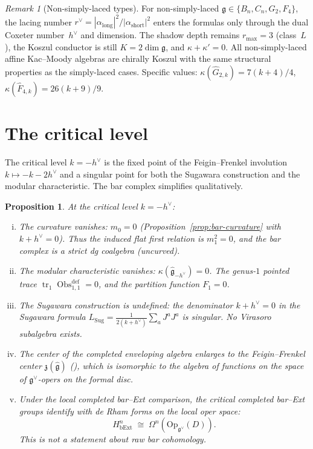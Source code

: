 \documentclass[11pt]{article}
\theoremstyle{plain}
\newtheorem{proposition}[theorem]{Proposition}
\theoremstyle{definition}
\theoremstyle{remark}
\newtheorem{remark}[theorem]{Remark}
\newcommand{\fg}{\mathfrak{g}}
\newcommand{\ghat}{\widehat{\fg}}
\numberwithin{equation}{section}
\begin{document}
\begin{remark}[Non-simply-laced types]\label{rem:nsl}
For non-simply-laced $\fg \in \{B_n, C_n, G_2, F_4\}$,
the lacing number
$r^\vee = |\alpha_{\mathrm{long}}|^2/|\alpha_{\mathrm{short}}|^2$
enters the formulas only through the dual Coxeter
number~$h^\vee$ and dimension. The shadow depth remains
$r_{\max} = 3$ (class~$L$), the Koszul conductor is
still $K = 2\dim\fg$, and $\kappa + \kappa' = 0$.
All non-simply-laced affine Kac--Moody algebras are
chirally Koszul with the same structural properties as
the simply-laced cases. Specific values:
$\kappa(\widehat{G}_{2,k}) = 7(k{+}4)/4$,
$\kappa(\widehat{F}_{4,k}) = 26(k{+}9)/9$.
\end{remark}


\section{The critical level}\label{sec:critical}

The critical level $k = -h^\vee$ is the fixed point of the
Feigin--Frenkel involution $k \mapsto -k - 2h^\vee$ and a
singular point for both the Sugawara construction and the
modular characteristic. The bar complex simplifies
qualitatively.

\begin{proposition}\label{prop:critical-bar}
At the critical level $k = -h^\vee$:
\begin{enumerate}[(i)]
\item The curvature vanishes: \(m_0=0\)
 \textup{(}Proposition~\textup{\ref{prop:bar-curvature}}
 with $k + h^\vee = 0$\textup{)}.
 Thus the induced flat first relation is \(m_1^2=0\), and the bar
 complex is a strict dg coalgebra \textup{(}uncurved\textup{)}.
\item The modular characteristic vanishes:
 $\kappa(\ghat_{-h^\vee}) = 0$. The genus-$1$
 pointed trace
 $\operatorname{tr}_1\operatorname{Obs}^{\mathrm{def}}_{1,1}=0$, and the
 partition function $F_1 = 0$.
\item The Sugawara construction is undefined: the
 denominator $k + h^\vee = 0$ in the Sugawara
 formula $L_{\mathrm{Sug}}
 = \frac{1}{2(k+h^\vee)} \sum_a J^a J^a$
 is singular. No Virasoro subalgebra exists.
\item The center of the completed enveloping algebra
 enlarges to the Feigin--Frenkel center
 $\mathfrak{z}(\ghat)$
 \textup{(}\cite{FF92}\textup{)},
 which is isomorphic to the algebra of functions on
 the space of $\fg^\vee$-opers on the formal disc.
\item Under the local completed bar--Ext comparison, the critical
 completed bar--Ext groups identify with de Rham forms on the local
 oper space:
 \[
 H^n_{\mathrm{bExt}}\;\cong\;
 \Omega^n(\mathrm{Op}_{\fg^\vee}(D)).
 \]
 This is not a statement about raw bar cohomology.
\end{enumerate}
\end{proposition}
\end{document}
